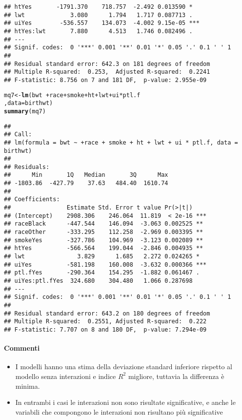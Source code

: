 \documentclass{article}\usepackage[]{graphicx}\usepackage[]{color}
\makeatletter
\newcommand{\hlopt}[1]{\textcolor[rgb]{0,0,0}{#1}}%
\newcommand{\hlstd}[1]{\textcolor[rgb]{0.345,0.345,0.345}{#1}}%
\newcommand{\hlkwb}[1]{\textcolor[rgb]{0.69,0.353,0.396}{#1}}%
\newcommand{\hlkwc}[1]{\textcolor[rgb]{0.333,0.667,0.333}{#1}}%
\newcommand{\hlkwd}[1]{\textcolor[rgb]{0.737,0.353,0.396}{\textbf{#1}}}%
\newenvironment{kframe}{%
 \def\at@end@of@kframe{}%
 \ifinner\ifhmode%
  \def\at@end@of@kframe{\end{minipage}}%
  \begin{minipage}{\columnwidth}%
 \fi\fi%
 \def\FrameCommand##1{\hskip\@totalleftmargin \hskip-\fboxsep
 \colorbox{shadecolor}{##1}\hskip-\fboxsep
     \hskip-\linewidth \hskip-\@totalleftmargin \hskip\columnwidth}%
 \MakeFramed {\advance\hsize-\width
   \@totalleftmargin\z@ \linewidth\hsize
   \@setminipage}}%
 {\par\unskip\endMakeFramed%
 \at@end@of@kframe}
\newenvironment{knitrout}{}{} %
\makeatother
\begin{document}
\begin{knitrout}
\begin{kframe}
\begin{verbatim}
## htYes       -1791.370    718.757  -2.492 0.013590 *  
## lwt             3.080      1.794   1.717 0.087713 .  
## uiYes        -536.557    134.073  -4.002 9.15e-05 ***
## htYes:lwt       7.880      4.513   1.746 0.082496 .  
## ---
## Signif. codes:  0 '***' 0.001 '**' 0.01 '*' 0.05 '.' 0.1 ' ' 1
## 
## Residual standard error: 642.3 on 181 degrees of freedom
## Multiple R-squared:  0.253,	Adjusted R-squared:  0.2241 
## F-statistic: 8.756 on 7 and 181 DF,  p-value: 2.955e-09
\end{verbatim}
\begin{alltt}
\hlstd{mq7} \hlkwb{<-} \hlkwd{lm}\hlstd{(bwt} \hlopt{~  +} \hlstd{race} \hlopt{+} \hlstd{smoke} \hlopt{+} \hlstd{ht} \hlopt{+} \hlstd{lwt} \hlopt{+} \hlstd{ui} \hlopt{*} \hlstd{ptl.f}
          \hlstd{,}\hlkwc{data}\hlstd{=birthwt)}
\hlkwd{summary}\hlstd{(mq7)}
\end{alltt}
\begin{verbatim}
## 
## Call:
## lm(formula = bwt ~ +race + smoke + ht + lwt + ui * ptl.f, data = birthwt)
## 
## Residuals:
##      Min       1Q   Median       3Q      Max 
## -1803.86  -427.79    37.63   484.40  1610.74 
## 
## Coefficients:
##                Estimate Std. Error t value Pr(>|t|)    
## (Intercept)    2908.306    246.064  11.819  < 2e-16 ***
## raceBlack      -447.544    146.094  -3.063 0.002525 ** 
## raceOther      -333.295    112.258  -2.969 0.003395 ** 
## smokeYes       -327.786    104.969  -3.123 0.002089 ** 
## htYes          -566.564    199.044  -2.846 0.004935 ** 
## lwt               3.829      1.685   2.272 0.024265 *  
## uiYes          -581.198    160.008  -3.632 0.000366 ***
## ptl.fYes       -290.364    154.295  -1.882 0.061467 .  
## uiYes:ptl.fYes  324.680    304.480   1.066 0.287698    
## ---
## Signif. codes:  0 '***' 0.001 '**' 0.01 '*' 0.05 '.' 0.1 ' ' 1
## 
## Residual standard error: 643.2 on 180 degrees of freedom
## Multiple R-squared:  0.2551,	Adjusted R-squared:  0.222 
## F-statistic: 7.707 on 8 and 180 DF,  p-value: 7.294e-09
\end{verbatim}
\end{kframe}
\end{knitrout}

\paragraph{Commenti}
\begin{itemize}
\item I modelli hanno una stima della deviazione standard inferiore rispetto al modello senza interazioni e indice $R^2$ migliore, tuttavia la differenza è minima.
\item In entrambi i casi le interazioni non sono risultate significative, e anche le variabili che compongono le interazioni non risultano più significative
\end{itemize}
\end{document}
